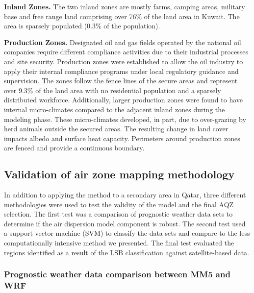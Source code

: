 \textbf{Inland Zones.} The two inland zones are mostly farms, camping areas, military base and free range land comprising over 76\% of the land area in Kuwait. The area is sparsely populated (0.3\% of the population).  

\textbf{Production Zones.} Designated oil and gas fields operated by the national oil companies require different compliance activities due to their industrial processes and site security. Production zones were established to allow the oil industry to apply their internal compliance programs under local regulatory guidance and supervision. The zones follow the fence lines of the secure areas and represent over 9.3\% of the land area with no residential population and a sparsely distributed workforce. Additionally, larger production zones were found to have internal micro-climates compared to the adjacent inland zones during the modeling phase.  These micro-climates developed, in part, due to over-grazing by herd animals outside the secured areas.  The resulting change in land cover impacts albedo and surface heat capacity. Perimeters around production zones are fenced and provide a continuous boundary.

\subsection{Validation of air zone mapping methodology}

In addition to applying the method to a secondary area in Qatar, three different methodologies were used to test the validity of the model and the final AQZ selection. The first test was a comparison of prognostic weather data sets to determine if the air dispersion model component is robust. The second test used a support vector machine (SVM) to classify the data sets and compare to the less computationally intensive method we presented. The final test evaluated the regions identified as a result of the LSB classification against satellite-based data.

\subsubsection{Prognostic weather data comparison between MM5 and WRF}

